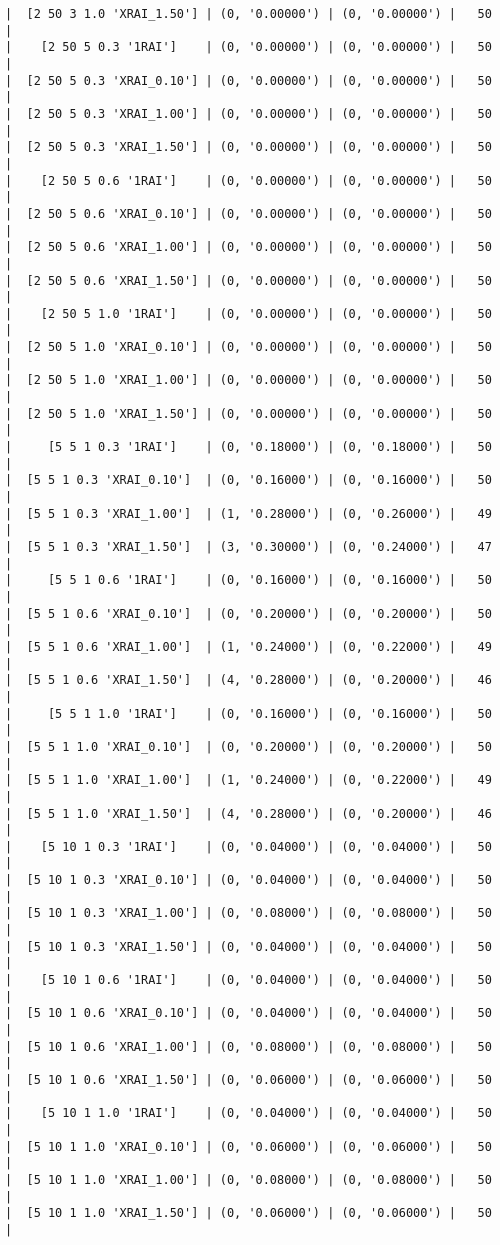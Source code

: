\documentclass{article}
\begin{document}
\begin{verbatim}
|  [2 50 3 1.0 'XRAI_1.50'] | (0, '0.00000') | (0, '0.00000') |   50  |
|    [2 50 5 0.3 '1RAI']    | (0, '0.00000') | (0, '0.00000') |   50  |
|  [2 50 5 0.3 'XRAI_0.10'] | (0, '0.00000') | (0, '0.00000') |   50  |
|  [2 50 5 0.3 'XRAI_1.00'] | (0, '0.00000') | (0, '0.00000') |   50  |
|  [2 50 5 0.3 'XRAI_1.50'] | (0, '0.00000') | (0, '0.00000') |   50  |
|    [2 50 5 0.6 '1RAI']    | (0, '0.00000') | (0, '0.00000') |   50  |
|  [2 50 5 0.6 'XRAI_0.10'] | (0, '0.00000') | (0, '0.00000') |   50  |
|  [2 50 5 0.6 'XRAI_1.00'] | (0, '0.00000') | (0, '0.00000') |   50  |
|  [2 50 5 0.6 'XRAI_1.50'] | (0, '0.00000') | (0, '0.00000') |   50  |
|    [2 50 5 1.0 '1RAI']    | (0, '0.00000') | (0, '0.00000') |   50  |
|  [2 50 5 1.0 'XRAI_0.10'] | (0, '0.00000') | (0, '0.00000') |   50  |
|  [2 50 5 1.0 'XRAI_1.00'] | (0, '0.00000') | (0, '0.00000') |   50  |
|  [2 50 5 1.0 'XRAI_1.50'] | (0, '0.00000') | (0, '0.00000') |   50  |
|     [5 5 1 0.3 '1RAI']    | (0, '0.18000') | (0, '0.18000') |   50  |
|  [5 5 1 0.3 'XRAI_0.10']  | (0, '0.16000') | (0, '0.16000') |   50  |
|  [5 5 1 0.3 'XRAI_1.00']  | (1, '0.28000') | (0, '0.26000') |   49  |
|  [5 5 1 0.3 'XRAI_1.50']  | (3, '0.30000') | (0, '0.24000') |   47  |
|     [5 5 1 0.6 '1RAI']    | (0, '0.16000') | (0, '0.16000') |   50  |
|  [5 5 1 0.6 'XRAI_0.10']  | (0, '0.20000') | (0, '0.20000') |   50  |
|  [5 5 1 0.6 'XRAI_1.00']  | (1, '0.24000') | (0, '0.22000') |   49  |
|  [5 5 1 0.6 'XRAI_1.50']  | (4, '0.28000') | (0, '0.20000') |   46  |
|     [5 5 1 1.0 '1RAI']    | (0, '0.16000') | (0, '0.16000') |   50  |
|  [5 5 1 1.0 'XRAI_0.10']  | (0, '0.20000') | (0, '0.20000') |   50  |
|  [5 5 1 1.0 'XRAI_1.00']  | (1, '0.24000') | (0, '0.22000') |   49  |
|  [5 5 1 1.0 'XRAI_1.50']  | (4, '0.28000') | (0, '0.20000') |   46  |
|    [5 10 1 0.3 '1RAI']    | (0, '0.04000') | (0, '0.04000') |   50  |
|  [5 10 1 0.3 'XRAI_0.10'] | (0, '0.04000') | (0, '0.04000') |   50  |
|  [5 10 1 0.3 'XRAI_1.00'] | (0, '0.08000') | (0, '0.08000') |   50  |
|  [5 10 1 0.3 'XRAI_1.50'] | (0, '0.04000') | (0, '0.04000') |   50  |
|    [5 10 1 0.6 '1RAI']    | (0, '0.04000') | (0, '0.04000') |   50  |
|  [5 10 1 0.6 'XRAI_0.10'] | (0, '0.04000') | (0, '0.04000') |   50  |
|  [5 10 1 0.6 'XRAI_1.00'] | (0, '0.08000') | (0, '0.08000') |   50  |
|  [5 10 1 0.6 'XRAI_1.50'] | (0, '0.06000') | (0, '0.06000') |   50  |
|    [5 10 1 1.0 '1RAI']    | (0, '0.04000') | (0, '0.04000') |   50  |
|  [5 10 1 1.0 'XRAI_0.10'] | (0, '0.06000') | (0, '0.06000') |   50  |
|  [5 10 1 1.0 'XRAI_1.00'] | (0, '0.08000') | (0, '0.08000') |   50  |
|  [5 10 1 1.0 'XRAI_1.50'] | (0, '0.06000') | (0, '0.06000') |   50  |

\end{verbatim}
\end{document}
